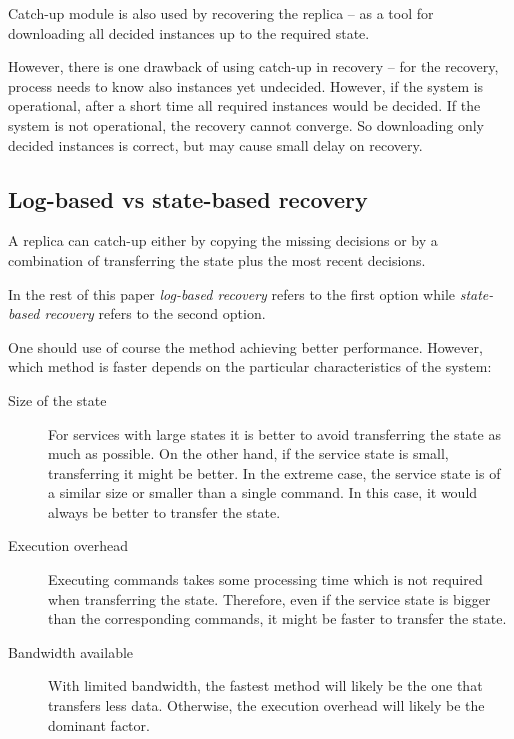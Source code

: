 
Catch-up module is also used by recovering the replica -- as a tool for downloading all decided instances up to the required state.

However, there is one drawback of using catch-up in recovery -- for the recovery, process needs to know also instances yet undecided.  However, if the system is operational, after a short time all required instances would be decided. If the system  is not operational, the recovery cannot converge. So downloading only decided instances is correct, but may cause small delay on recovery.

\subsection{Log-based vs state-based recovery}
\label{subsec:log_based_state_based_recovery}
A replica can catch-up either by copying the missing decisions or by a combination of transferring the state plus the most recent decisions.

In the rest of this paper \emph{log-based recovery} refers to the first option while \emph{state-based recovery} refers to the second option.

One should use of course the method achieving better performance. However, which method is faster depends on the particular characteristics of the system:

\begin{description}
  \item[Size of the state] For services with large states  it is better to avoid transferring the state as much as possible. On the other hand, if the service state is small, transferring it might be better. In the extreme case, the service state is of a similar size or smaller than a single command. In this case, it would always be better to transfer the state.

  \item[Execution overhead] Executing commands takes some processing time which is not required when transferring the state. Therefore, even if the service state is bigger than the corresponding commands, it might be faster to transfer the state.

  \item[Bandwidth available] With limited bandwidth, the fastest  method will likely be the one that transfers less data. Otherwise, the execution overhead will likely be the dominant factor.
\end{description}

